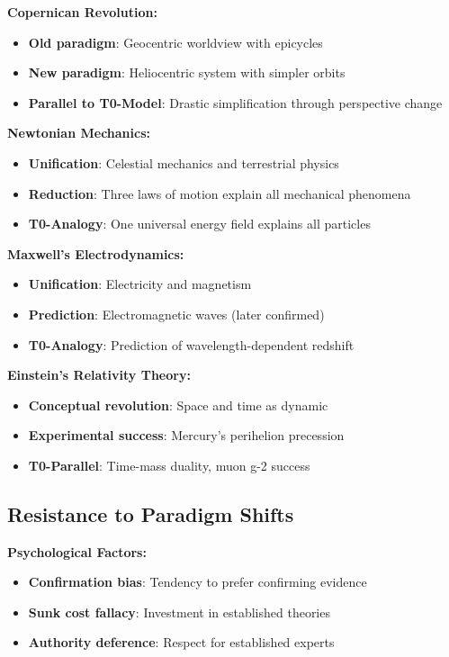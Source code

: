 \documentclass[12pt,a4paper]{report}
\begin{document}
	\textbf{Copernican Revolution:}
	\begin{itemize}
		\item \textbf{Old paradigm}: Geocentric worldview with epicycles
		\item \textbf{New paradigm}: Heliocentric system with simpler orbits
		\item \textbf{Parallel to T0-Model}: Drastic simplification through perspective change
	\end{itemize}
	
	\textbf{Newtonian Mechanics:}
	\begin{itemize}
		\item \textbf{Unification}: Celestial mechanics and terrestrial physics
		\item \textbf{Reduction}: Three laws of motion explain all mechanical phenomena
		\item \textbf{T0-Analogy}: One universal energy field explains all particles
	\end{itemize}
	
	\textbf{Maxwell's Electrodynamics:}
	\begin{itemize}
		\item \textbf{Unification}: Electricity and magnetism
		\item \textbf{Prediction}: Electromagnetic waves (later confirmed)
		\item \textbf{T0-Analogy}: Prediction of wavelength-dependent redshift
	\end{itemize}
	
	\textbf{Einstein's Relativity Theory:}
	\begin{itemize}
		\item \textbf{Conceptual revolution}: Space and time as dynamic
		\item \textbf{Experimental success}: Mercury's perihelion precession
		\item \textbf{T0-Parallel}: Time-mass duality, muon g-2 success
	\end{itemize}
	
	\subsection{Resistance to Paradigm Shifts}\label{subsec:resistance_paradigm_shifts}
	
	\textbf{Psychological Factors:}
	\begin{itemize}
		\item \textbf{Confirmation bias}: Tendency to prefer confirming evidence
		\item \textbf{Sunk cost fallacy}: Investment in established theories
		\item \textbf{Authority deference}: Respect for established experts
	\end{itemize}
	
\end{document}
